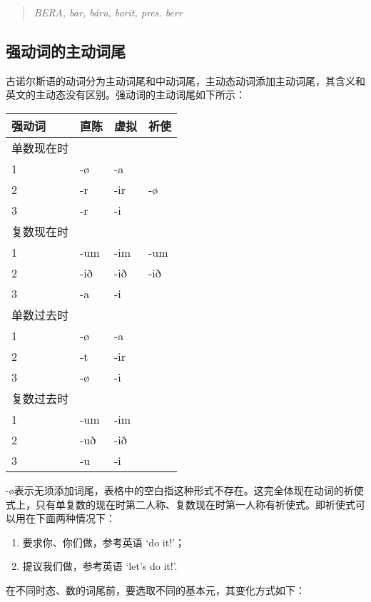 \begin{quote}
    \textit{BERA, bar, báru, borit, pres. berr}
\end{quote}

\subsection{强动词的主动词尾}\label{强动词}
古诺尔斯语的动词分为主动词尾和中动词尾，主动态动词添加主动词尾，其含义和英文的主动态没有区别。强动词的主动词尾如下所示：
\begin{longtable}{llll}
    \toprule
    强动词   & 直陈  & 虚拟  & 祈使  \\
    \midrule
    \endhead
    \bottomrule
    \endfoot
    单数现在时 &     &     &     \\
    1     & -ø  & -a  &     \\
    2     & -r  & -ir & -ø  \\
    3     & -r  & -i  &     \\
    复数现在时 &     &     &     \\
    1     & -um & -im & -um \\
    2     & -ið & -ið & -ið \\
    3     & -a  & -i  &     \\
    单数过去时 &     &     &     \\
    1     & -ø  & -a  &     \\
    2     & -t  & -ir &     \\
    3     & -ø  & -i  &     \\
    复数过去时 &     &     &     \\
    1     & -um & -im &     \\
    2     & -uð & -ið &     \\
    3     & -u  & -i  &     \\
\end{longtable}

-ø表示无须添加词尾，表格中的空白指这种形式不存在。这完全体现在动词的祈使式上，只有单复数的现在时第二人称、复数现在时第一人称有祈使式。即祈使式可以用在下面两种情况下：

\begin{enumerate}
    \item
          要求你、你们做，参考英语 `do it!'；
    \item
          提议我们做，参考英语 `let's do it!'.
\end{enumerate}

在不同时态、数的词尾前，要选取不同的基本元，其变化方式如下：

